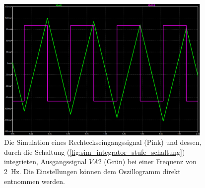 \documentclass[12pt,english,ngerman]{scrartcl}
\begin{document}
\begin{figure}[H]
  \centering
    \includegraphics[width=\linewidth, height=7cm]{./figures/integrator/sim/mit_stufe/rechteck100mv_500ms.png}
  \caption{Die Simulation eines Rechteckseingangssignal (Pink) und dessen,
  durch die Schaltung (\autoref{fig:sim_integrator_stufe_schaltung})
  integrieten, Ausgangssignal $VA2$ (Grün) bei einer Frequenz von \SI{2}{\hertz}.
  Die Einstellungen können dem Oszillogramm direkt entnommen werden.}
  \label{fig:sim_int_stufe_rect}
\end{figure}



\end{document}

